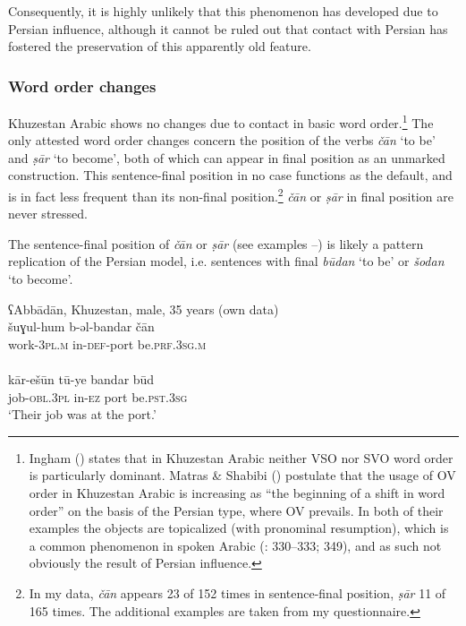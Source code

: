 \documentclass[output=paper,nonflat]{langsci/langscibook}
\begin{document}
Consequently, it is highly unlikely that this phenomenon has developed due to Persian influence, although it cannot be ruled out that contact with Persian has fostered the preservation of this apparently old feature. 


\subsubsection{Word order changes} \label{woc}

Khuzestan Arabic shows no changes due to contact in basic word order.\footnote{Ingham (\citeyear[715]{Ingham1991}) states that in Khuzestan Arabic neither VSO nor SVO word order is particularly dominant. Matras \& Shabibi (\citeyear[147]{MatrasShabibi2007}) postulate that the usage of OV order in Khuzestan Arabic is increasing as “the beginning of a shift in word order” on the basis of the Persian type, where OV prevails. In both of their examples the objects are topicalized (with pronominal resumption), which is a common phenomenon in spoken Arabic (\citealt{Brustad2000}: 330–333; 349), and as such not obviously the result of Persian influence.}  The only attested word order changes concern the position of the verbs \textit{čān} ‘to be’ and \textit{ṣār} ‘to become’, both of which can appear in final position as an unmarked construction. This sentence-final position in no case functions as the default, and is in fact less frequent than its non-final position.\footnote{In my data, \textit{čān} appears 23 of 152 times in sentence-final position, \textit{ṣār} 11 of 165 times. The additional examples are taken from my questionnaire.} \textit{čān} or \textit{ṣār} in final position are never stressed.

The sentence-final position of \textit{čān} or \textit{ṣār} (see examples --) is likely a pattern replication of the Persian model, i.e. sentences with final \textit{būdan} ‘to be’ or \textit{šodan} ‘to become’.

\ea\label{port}
\ea
{ʕAbbādān, Khuzestan, male, 35 years (own data)}\\
\gll šuɣul-hum b-əl-bandar čān\\
     work-\textsc{3pl}.\textsc{m} in-\textsc{def}-port be.\textsc{prf.3sg.m}\\
 
\\
\gll kār-ešūn tū-ye bandar būd\\
     job-\textsc{obl}.3\textsc{pl} in-\textsc{ez} port be.\textsc{pst.3sg}\\
\glt ‘Their job was at the port.’
\z\z
\end{document}
